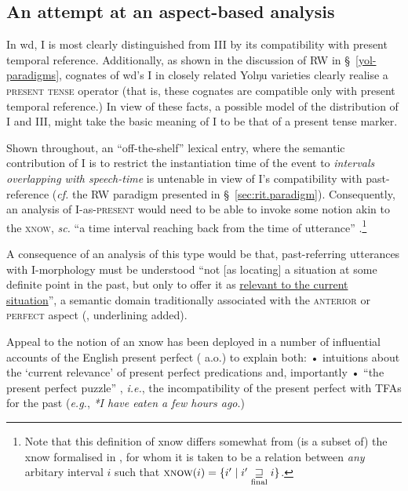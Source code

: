 
\subsection{An attempt at an aspect-based analysis}

In \acrshort{wd}, \gls{I} is most clearly distinguished from \gls{III} by its compatibility with present temporal reference. Additionally, as shown in the discussion of \acrlong{RW} in \S~\ref{yol-paradigms}, cognates of \acrshort{wd}'s \gls{I} in closely related Yolŋu varieties clearly realise a \textsc{present tense} operator (that is, these cognates are compatible only with present temporal reference.) In view of these facts, a possible model of the distribution of \gls{I} and \gls{III}, might take the basic meaning of \gls{I} to be that of a present tense marker.

Shown throughout, an ``off-the-shelf'' lexical entry, where the semantic contribution of \gls{I} is to restrict the instantiation time of the event to\textit{ intervals overlapping with speech-time} is untenable in view of \gls{I}'s compatibility with past-reference (\textit{cf.} the \acrshort{RW} paradigm presented in \S~\ref{sec:rit.paradigm}). Consequently, an analysis of \gls{I}-as-\textsc{present} would need to be able to invoke some notion akin to the \textsc{\acrfull{xnow}}, \textit{sc.} ``a time interval reaching back from the time of utterance'' \citep[49]{Cover2010}.\footnote{Note that this definition of \acrshort{xnow} differs somewhat from (is a subset of) the \acrshort{xnow} formalised in \citealt[225]{Stump1985}, for whom it is taken to be a relation between \textsl{any} arbitary interval $ i $ such that $ \textsc{xnow}(i) = \{i'\mid i'\underset{\text{final}}{\sqsupseteq} i\}$.}

A consequence of an analysis of this type would be that, past-referring utterances with \gls{I}-morphology must be understood ``not [as locating] a situation at some definite point in the past, but only to offer it as \ul{relevant to the current situation}'', a semantic domain traditionally associated with the \textsc{anterior} or \textsc{perfect} aspect (\citealp[62]{Bybee1994}, underlining added).





Appeal to the notion of an \acrshort{xnow} has been deployed in a number of influential accounts of the English present perfect (\citealp[notably][]{McCoard1978, Portner2003} a.o.) to explain both: • intuitions about the `current relevance' of present perfect predications and, importantly • ``the present perfect puzzle'' \citep[see][]{Klein1992,Schaden2009}, \textit{i.e.}, the incompatibility of the present perfect with \acrshort{TFA}s for the past (\textit{e.g.}, \textit{*I have eaten a few hours ago}.)


